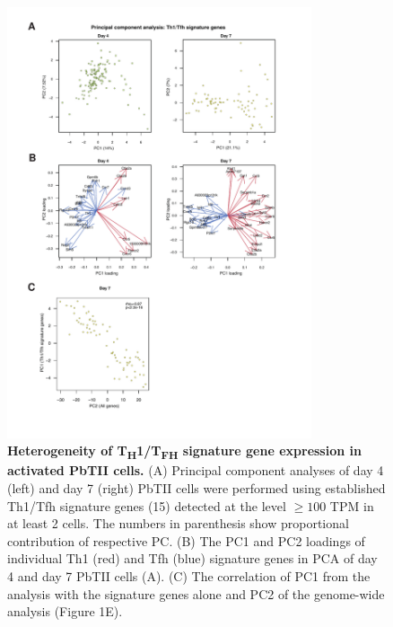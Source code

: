 \begin{figure}
    \centering
    \includegraphics[width=0.8\textwidth]{"Fig S6 rev3"}
    \caption[Heterogeneity of T\textsubscript{H}\textnormal{1}/T\textsubscript{FH} signature gene expression in activated PbTII cells]{\textbf{Heterogeneity of T\textsubscript{H}\textnormal{1}/T\textsubscript{FH} signature gene expression in activated PbTII cells.} (A) Principal component analyses of day 4 (left) and day 7 (right) PbTII cells were performed using established Th1/Tfh signature genes (15) detected at the level \( \geq 100 \) TPM in at least 2 cells. The numbers in parenthesis show proportional contribution of respective PC. (B) The PC1 and PC2 loadings of individual Th1 (red) and Tfh (blue) signature genes in PCA of day 4 and day 7 PbTII cells (A). (C) The correlation of PC1 from the analysis with the signature genes alone and PC2 of the genome-wide analysis (Figure 1E).}
    \label{fig:ms6}
\end{figure}

